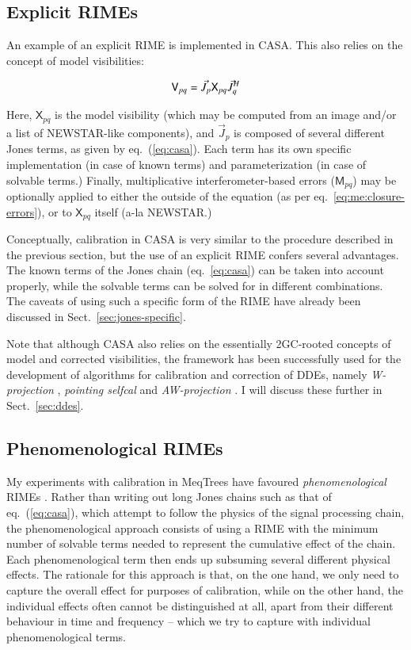 \documentclass[]{aa}
\newcommand{\herm}{H}
\newcommand{\jones}[2]{\vec {#1}_{#2}}
\newcommand{\jonesT}[2]{\vec {#1}^{\herm}_{#2}}
\newcommand{\coh}[2]{\mathsf{{#1}}_{{#2}}}
\begin{document}
\subsection{Explicit RIMEs}

An example of an explicit RIME is implemented in CASA. This also relies on the concept of model visibilities:

\begin{equation}\label{eq:casa-rime}
\coh{V}{pq}  =  \jones{J}{p} \coh{X}{pq} \jonesT{J}{q} \\
\end{equation}

Here, $\coh{X}{pq}$ is the model visibility (which may be computed from an image and/or
a list of NEWSTAR-like components), and $\jones{J}{p}$ is composed of several different Jones terms, as given by eq.~(\ref{eq:casa}). Each term has its own specific implementation (in case of known terms) and parameterization (in case of solvable terms.) Finally, multiplicative interferometer-based errors ($\coh{M}{pq}$) may be optionally applied to either the outside of the equation (as per eq.~\ref{eq:me:closure-errors}), or to $\coh{X}{pq}$ itself (a-la NEWSTAR.) 

Conceptually, calibration in CASA is very similar to the procedure described in the previous section, but the use of an explicit RIME confers several advantages. The known terms of the Jones chain (eq.~\ref{eq:casa}) can be taken into account properly, while the solvable terms can be solved for in different combinations. The caveats of using such a specific form of the RIME have already been discussed in Sect.~\ref{sec:jones-specific}.

Note that although CASA also relies on the essentially 2GC-rooted concepts of model and corrected visibilities, the framework has been successfully used for the development of algorithms for calibration and correction of DDEs, namely \emph{W-projection} \citep{Cornwell:wproj}, \emph{pointing selfcal} \citep{SB:pointing} and \emph{AW-projection} \citep{SB:imageplane}. I will discuss these further in Sect.~\ref{sec:ddes}.

\subsection{\label{sec:phenomenological}Phenomenological RIMEs}

My experiments with calibration in MeqTrees have favoured \emph{phenomenological} RIMEs \citep{meqtrees}. Rather than writing out long Jones chains such as that of eq.~(\ref{eq:casa}), which attempt to follow the physics of the signal processing chain, the phenomenological approach consists of using a RIME with the minimum number of solvable terms needed to represent the cumulative effect of the chain. Each phenomenological term then ends up subsuming several different physical effects. The rationale for this approach is that, on the one hand, we only need to capture the overall effect for purposes of calibration, while on the other hand, the individual effects often cannot be distinguished at all, apart from their different behaviour in time and frequency -- which we try to capture with individual phenomenological terms.
\end{document}
